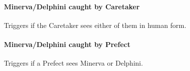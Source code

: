 \paragraph{Minerva/Delphini caught by Caretaker} Triggers if the Caretaker sees either of them in human form.

\begin{dialogue}{} 
\end{dialogue} 

\paragraph{Minerva/Delphini caught by Prefect} Triggers if a Prefect sees Minerva or Delphini.

\begin{dialogue}{} 
\end{dialogue} 

\pagebreak 


